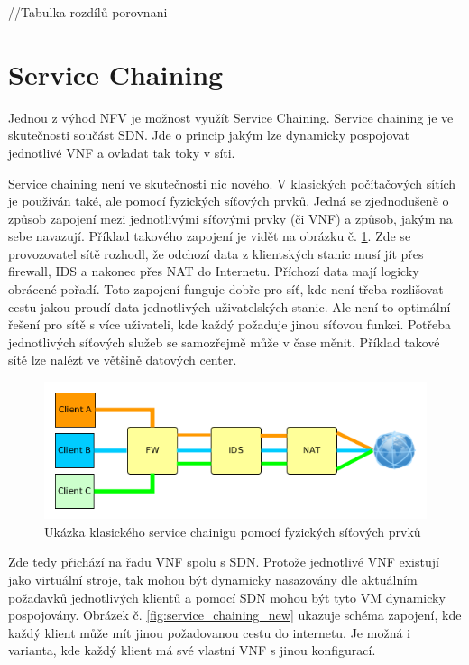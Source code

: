//Tabulka rozdílů porovnani

\cite{Toward_NFV}

\section{Service Chaining} \label{sub:SDN}

Jednou z výhod NFV je možnost využít Service Chaining. Service chaining je ve skutečnosti součást SDN. Jde o princip jakým lze dynamicky pospojovat jednotlivé VNF a ovladat tak toky v síti. \cite{SDN_book}

Service chaining není ve skutečnosti nic nového. V klasických počítačových sítích je používán také, ale pomocí fyzických síťových prvků. Jedná se zjednodušeně o způsob zapojení mezi jednotlivými síťovými prvky (či VNF) a způsob, jakým na sebe navazují. Příklad takového zapojení je vidět na obrázku č. \ref{fig:service_chaining}. Zde se provozovatel sítě rozhodl, že odchozí data z klientských stanic musí jít přes firewall, IDS a nakonec přes NAT do Internetu. Příchozí data mají logicky obrácené pořadí. Toto zapojení funguje dobře pro síť, kde není třeba rozlišovat cestu jakou proudí data jednotlivých uživatelských stanic. Ale není to optimální řešení pro sítě s více uživateli, kde každý požaduje jinou síťovou funkci. Potřeba jednotlivých síťových služeb se samozřejmě může v čase měnit. Příklad takové sítě lze nalézt ve většině datových center. 

\begin{figure}[h]
\begin{centering}
\includegraphics[scale=0.55]{images/service_chaining}
\par\end{centering}
\caption{Ukázka klasického service chainigu pomocí fyzických síťových prvků\label{fig:service_chaining}}
\end{figure}

Zde tedy přichází na řadu VNF spolu s SDN. Protože jednotlivé VNF existují jako virtuální stroje, tak mohou být dynamicky nasazovány dle aktuálním požadavků jednotlivých klientů a pomocí SDN mohou být tyto VM dynamicky pospojovány. Obrázek č. \ref{fig:service_chaining_new} ukazuje schéma zapojení, kde každý klient může mít jinou požadovanou cestu do internetu. Je možná i varianta, kde každý klient má své vlastní VNF s jinou konfigurací.

